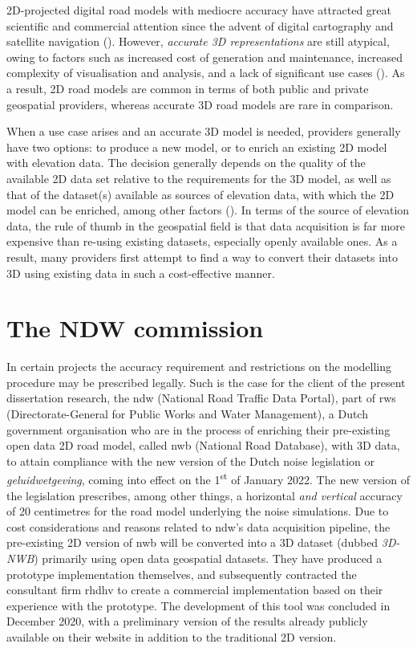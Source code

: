 2D-projected digital road models with mediocre accuracy have attracted great scientific and commercial attention since the advent of digital cartography and satellite navigation (\cite{taylor_etal_2001, fouque_bonnifait_2008, yue_etal_2008, chen_hsu_2020}). However, \textit{accurate 3D representations} are still atypical, owing to factors such as increased cost of generation and maintenance, increased complexity of visualisation and analysis, and a lack of significant use cases (\cite{zhu_li_2007, wang_etal_2014}). As a result, 2D road models are common in terms of both public and private geospatial providers, whereas accurate 3D road models are rare in comparison.

When a use case arises and an accurate 3D model is needed, providers generally have two options: to produce a new model, or to enrich an existing 2D model with elevation data. The decision generally depends on the quality of the available 2D data set relative to the requirements for the 3D model, as well as that of the dataset(s) available as sources of elevation data, with which the 2D model can be enriched, among other factors (\cite{zhu_li_2007, zhu_li_2008, wang_etal_2014}). In terms of the source of elevation data, the rule of thumb in the geospatial field is that data acquisition is far more expensive than re-using existing datasets, especially openly available ones. As a result, many providers first attempt to find a way to convert their datasets into 3D using existing data in such a cost-effective manner.

\section{The NDW commission}
\label{sec:commission}

In certain projects the accuracy requirement and restrictions on the modelling procedure may be prescribed legally. Such is the case for the client of the present dissertation research, the \ac{ndw} (National Road Traffic Data Portal), part of \ac{rws} (Directorate-General for Public Works and Water Management), a Dutch government organisation who are in the process of enriching their pre-existing open data 2D road model, called \ac{nwb} (National Road Database), with 3D data, to attain compliance with the new version of the Dutch noise legislation or \textit{geluidwetgeving}, coming into effect on the 1\textsuperscript{st} of January 2022. The new version of the legislation prescribes, among other things, a horizontal \textit{and vertical} accuracy of 20 centimetres for the road model underlying the noise simulations. Due to cost considerations and reasons related to \ac{ndw}’s data acquisition pipeline, the pre-existing 2D version of \ac{nwb} will be converted into a 3D dataset (dubbed \textit{3D-NWB}) primarily using open data geospatial datasets. They have produced a prototype implementation themselves, and subsequently contracted the consultant firm \ac{rhdhv} to create a commercial implementation based on their experience with the prototype. The development of this tool was concluded in December 2020, with a preliminary version of the results already publicly available on their website in addition to the traditional 2D version.

